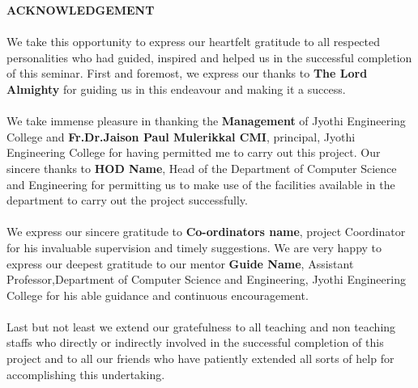 \linespread{1}
\begin{center}
\textbf{\fontsize{16}{32}\selectfont ACKNOWLEDGEMENT}\\
\end{center}
\fontsize{12}{28}\selectfont
\paragraph*{} We take this opportunity to express our heartfelt gratitude to all respected personalities who had guided, inspired and helped us in the successful completion of this seminar. First and foremost, we express our thanks to \textbf{The Lord Almighty} for guiding us in this endeavour and making it a success.

\paragraph*{} We take immense pleasure in thanking the \textbf{Management} of Jyothi Engineering College and  \textbf{Fr.Dr.Jaison Paul Mulerikkal CMI}, principal, Jyothi Engineering College for having permitted me to carry out this project. Our sincere thanks to \textbf{HOD Name}, Head of the Department of Computer Science and Engineering  for permitting us to make use of the facilities available in the department to carry out the project successfully.
\paragraph*{} We express our sincere gratitude to  \textbf{Co-ordinators name}, project Coordinator for his invaluable supervision and timely suggestions. We are very happy to express our deepest gratitude to our mentor \textbf{Guide Name}, Assistant Professor,Department of Computer Science and Engineering, Jyothi Engineering College for his able guidance and continuous encouragement.
\paragraph*{} Last but not least we extend our gratefulness to all teaching and non teaching staffs who directly or indirectly involved in the successful completion of this project and to all our friends who have patiently extended all sorts of help for accomplishing this undertaking.



\thispagestyle{empty}

\clearpage